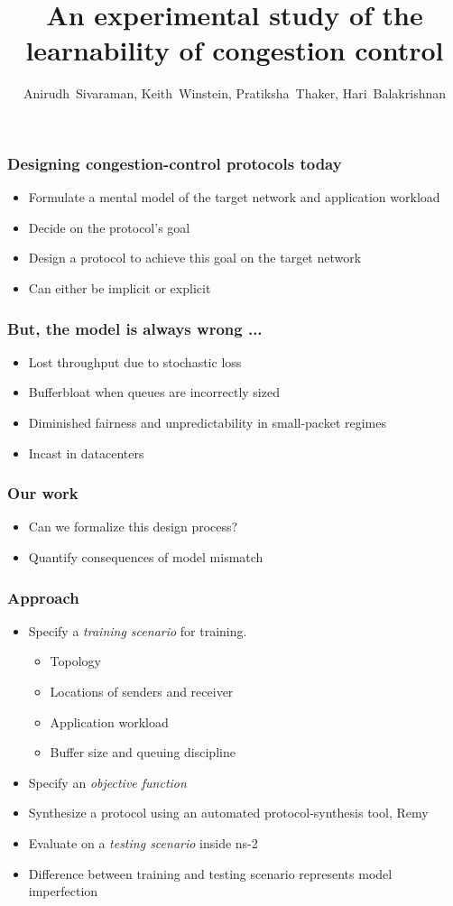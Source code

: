 \documentclass[svgnames]{beamer}
\title{An experimental study of the learnability of congestion control}
\author{Anirudh~Sivaraman, Keith~Winstein, Pratiksha~Thaker, Hari~Balakrishnan}
\institute{MIT CSAIL\vspace{\baselineskip}}
\begin{document}
\begin{frame}

\titlepage

\end{frame}

\begin{Large}
\begin{frame}
\frametitle{Designing congestion-control protocols today}
\begin{itemize}
\item Formulate a mental model of the target network and application workload
\item Decide on the protocol's goal
\item Design a protocol to achieve this goal on the target network
\item Can either be implicit or explicit
\end{itemize}
\end{frame}

\begin{frame}
\frametitle{But, the model is always wrong ...}
\begin{itemize}
\item Lost throughput due to stochastic loss 
\item Bufferbloat when queues are incorrectly sized
\item Diminished fairness and unpredictability in small-packet regimes
\item Incast in datacenters
\end{itemize}
\end{frame}

\begin{frame}
\frametitle{Our work}
\begin{itemize}
\item Can we formalize this design process?
\item Quantify consequences of model mismatch
\end{itemize}
\end{frame}

\begin{frame}
\frametitle{Approach}
\begin{itemize}
\item Specify a \textit{training scenario} for training.
\begin{itemize}
\item Topology
\item Locations of senders and receiver
\item Application workload
\item Buffer size and queuing discipline 
\end{itemize}
\item Specify an \textit{objective function}
\item Synthesize a protocol using an automated protocol-synthesis tool, Remy~\cite{remy}
\item Evaluate on a \textit{testing scenario} inside ns-2
\item Difference between training and testing scenario represents model imperfection
\end{itemize}
\end{frame}


\end{Large}
\end{document}
